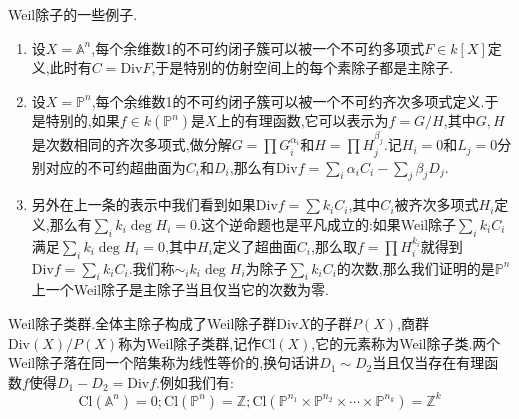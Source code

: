 Weil除子的一些例子.
\begin{enumerate}
	\item 设$X=\mathbb{A}^n$,每个余维数1的不可约闭子簇可以被一个不可约多项式$F\in k[X]$定义,此时有$C=\mathrm{Div}F$,于是特别的仿射空间上的每个素除子都是主除子.
	\item 设$X=\mathbb{P}^n$,每个余维数1的不可约闭子簇可以被一个不可约齐次多项式定义.于是特别的,如果$f\in k(\mathbb{P}^n)$是$X$上的有理函数,它可以表示为$f=G/H$,其中$G,H$是次数相同的齐次多项式,做分解$G=\prod G_i^{\alpha_i}$和$H=\prod H_j^{\beta_j}$.记$H_i=0$和$L_j=0$分别对应的不可约超曲面为$C_i$和$D_i$,那么有$\mathrm{Div}f=\sum_i\alpha_iC_i-\sum_j\beta_jD_j$.
	\item 另外在上一条的表示中我们看到如果$\mathrm{Div}f=\sum k_iC_i$,其中$C_i$被齐次多项式$H_i$定义,那么有$\sum_ik_i\deg H_i=0$.这个逆命题也是平凡成立的:如果Weil除子$\sum_ik_iC_i$满足$\sum_ik_i\deg H_i=0$,其中$H_i$定义了超曲面$C_i$,那么取$f=\prod H_i^{k_i}$就得到$\mathrm{Div}f=\sum_ik_iC_i$.我们称$\sim_ik_i\deg H_i$为除子$\sum_ik_iC_i$的次数,那么我们证明的是$\mathbb{P}^n$上一个Weil除子是主除子当且仅当它的次数为零.
\end{enumerate}

Weil除子类群.全体主除子构成了Weil除子群$\mathrm{Div}X$的子群$P(X)$,商群$\mathrm{Div}(X)/P(X)$称为Weil除子类群,记作$\mathrm{Cl}(X)$,它的元素称为Weil除子类.两个Weil除子落在同一个陪集称为线性等价的,换句话讲$D_1\sim D_2$当且仅当存在有理函数$f$使得$D_1-D_2=\mathrm{Div}f$.例如我们有:
$$\mathrm{Cl}(\mathbb{A}^n)=0;\mathrm{Cl}(\mathbb{P}^n)=\mathbb{Z};\mathrm{Cl}(\mathbb{P}^{n_1}\times\mathbb{P}^{n_2}\times\cdots\times\mathbb{P}^{n_k})=\mathbb{Z}^k$$

